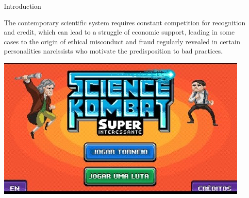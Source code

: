 \begin{frame}{Introduction}
    \begin{minipage}{0.45\linewidth}
        The contemporary scientific system requires constant competition for recognition and credit, which can lead to a struggle
of economic support, leading in some cases to the origin of ethical misconduct and fraud regularly revealed in certain personalities
narcissists who motivate the predisposition to bad practices.\\
    \end{minipage}
    \hspace{0.5cm}
    \begin{minipage}{0.4\linewidth}
        \centering
        \includegraphics[scale=0.45]{images/ima3.jpg}
    \end{minipage}
\end{frame}

